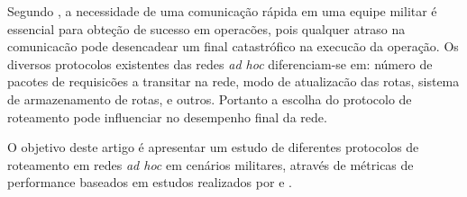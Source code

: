 Segundo \cite{salles}, a necessidade de uma comunica\c{c}\~ao r\'apida em uma equipe militar \'e essencial para obte\c{c}\~ao de sucesso em operac\~oes, pois qualquer atraso na comunicac\~ao pode desencadear um final catastr\'ofico na execuc\~ao da opera\c{c}\~ao. 
Os diversos protocolos existentes das redes \textit{ad hoc} diferenciam-se em: n\'umero de pacotes de requisic\~oes a transitar na rede, modo de atualizac\~ao das rotas, sistema de armazenamento de rotas, e outros. Portanto a escolha do protocolo de roteamento pode influenciar no desempenho final da rede.

O objetivo deste artigo \'e apresentar um estudo de diferentes protocolos de roteamento em redes \textit{ad hoc} em cen\'arios militares, atrav\'es de m\'etricas de performance baseados em estudos realizados por \cite{pereira} e \cite{salles}.
